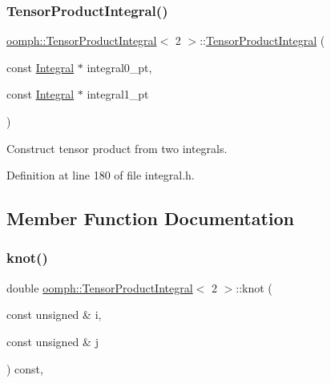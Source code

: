 \subsubsection{\texorpdfstring{Tensor\+Product\+Integral()}{TensorProductIntegral()}}
{\footnotesize\ttfamily \hyperlink{classoomph_1_1TensorProductIntegral}{oomph\+::\+Tensor\+Product\+Integral}$<$ 2 $>$\+::\hyperlink{classoomph_1_1TensorProductIntegral}{Tensor\+Product\+Integral} (\begin{DoxyParamCaption}\item[{const \hyperlink{classoomph_1_1Integral}{Integral} $\ast$}]{integral0\+\_\+pt,  }\item[{const \hyperlink{classoomph_1_1Integral}{Integral} $\ast$}]{integral1\+\_\+pt }\end{DoxyParamCaption})\hspace{0.3cm}{\ttfamily [inline]}}



Construct tensor product from two integrals. 



Definition at line 180 of file integral.\+h.



\subsection{Member Function Documentation}
\mbox{\label{classoomph_1_1TensorProductIntegral_3_012_01_4_a046e53a0afa30ee500b56aae87179091}} 
\subsubsection{\texorpdfstring{knot()}{knot()}}
{\footnotesize\ttfamily double \hyperlink{classoomph_1_1TensorProductIntegral}{oomph\+::\+Tensor\+Product\+Integral}$<$ 2 $>$\+::knot (\begin{DoxyParamCaption}\item[{const unsigned \&}]{i,  }\item[{const unsigned \&}]{j }\end{DoxyParamCaption}) const\hspace{0.3cm}{\ttfamily [inline]}, {\ttfamily [virtual]}}



